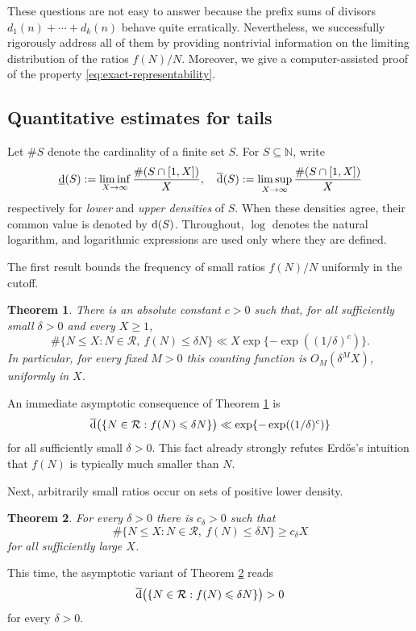 \documentclass[11pt,letterpaper,reqno]{amsart}
\numberwithin{equation}{section}
\newtheorem{theorem}{Theorem}[section]
\theoremstyle{remark}
\newcommand{\N}{\mathbb{N}}
\newcommand{\Rcal}{\mathcal{R}}
\newcommand{\1}{\mathbf 1}
\newcommand{\lowerdens}{\underline{\textup{d}}}
\newcommand{\upperdens}{\overline{\textup{d}}}
\renewcommand{\leq}{\leqslant}
\renewcommand{\geq}{\geqslant}
\begin{document}
These questions are not easy to answer because the prefix sums of divisors $d_1(n)+\cdots+d_k(n)$ behave quite erratically.
Nevertheless, we successfully rigorously address all of them by providing nontrivial information on the limiting distribution of the ratios $f(N)/N$.
Moreover, we give a computer-assisted proof of the property \eqref{eq:exact-representability}.


\subsection{Quantitative estimates for tails}

Let $\#S$ denote the cardinality of a finite set $S$.
For $S\subseteq\N$, write
\[
 \lowerdens(S):=\liminf_{X\to\infty}\frac{\#(S\cap[1,X])}{X},
 \quad
 \upperdens(S):=\limsup_{X\to\infty}\frac{\#(S\cap[1,X])}{X}
\]
respectively for \emph{lower} and \emph{upper densities} of $S$.
When these densities agree, their common value is denoted by $\textup{d}(S)$.
Throughout, $\log$ denotes the natural logarithm, and logarithmic
expressions are used only where they are defined.

The first result bounds the frequency
of small ratios $f(N)/N$ uniformly in the cutoff.

\begin{theorem}
\label{thm:small-upper}
There is an absolute constant $c>0$ such that, for all sufficiently small
$\delta>0$ and every $X\geq1$,
\[
 \#\{N\leq X:N\in\Rcal,\ f(N)\leq\delta N\}
 \ll X\exp\{-\exp((1/\delta)^c)\}.
\]
In particular, for every fixed $M>0$ this counting function is
$O_M(\delta^MX)$, uniformly in $X$.
\end{theorem}

An immediate asymptotic consequence of Theorem \ref{thm:small-upper} is
\[ \upperdens\big(\{N\in\Rcal : f(N)\leq\delta N\}\big) \ll \exp\{-\exp((1/\delta)^c)\} \]
for all sufficiently small $\delta>0$.
This fact already strongly refutes Erd\H{o}s's intuition that $f(N)$ is typically much smaller than $N$.

Next, arbitrarily small ratios occur on sets of positive lower density.

\begin{theorem}
\label{thm:small-values}
For every $\delta>0$ there is $c_\delta>0$ such that
\[
 \#\{N\leq X:N\in\Rcal,\ f(N)\leq\delta N\}
 \geq c_\delta X
\]
for all sufficiently large $X$.
\end{theorem}

This time, the asymptotic variant of Theorem \ref{thm:small-values} reads
\[ \upperdens\big(\{N\in\Rcal : f(N)\leq\delta N\}\big) > 0 \]
for every $\delta>0$.
\end{document}
